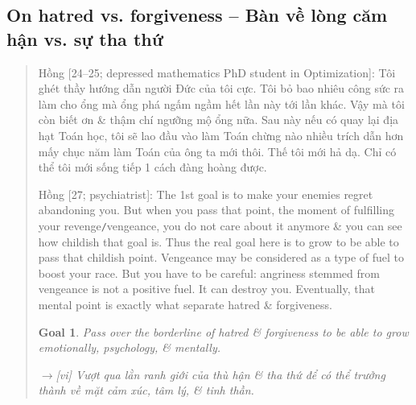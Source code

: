 \documentclass[12pt,oneside]{book}
\newtheorem{goal}{Goal}
\begin{document}
\subsection{On hatred vs. forgiveness -- Bàn về lòng căm hận vs. sự tha thứ}

\begin{quote}
	{\sf Hồng [24--25; depressed mathematics PhD student in Optimization]}: Tôi ghét thầy hướng dẫn người Đức của tôi cực. Tôi bỏ bao nhiêu công sức ra làm cho ổng mà ổng phá ngấm ngầm hết lần này tới lần khác. Vậy mà tôi còn biết ơn \& thậm chí ngưỡng mộ ổng nữa. Sau này nếu có quay lại địa hạt Toán học, tôi sẽ lao đầu vào làm Toán chừng nào nhiều trích dẫn hơn mấy chục năm làm Toán của ông ta mới thôi. Thế tôi mới hả dạ. Chỉ có thể tôi mới sống tiếp 1 cách đàng hoàng được.
	
	{\sf Hồng [27; psychiatrist]}: The 1st goal is to make your enemies regret abandoning you. But when you pass that point, the moment of fulfilling your revenge{\tt/}vengeance, you do not care about it anymore \& you can see how childish that goal is. Thus the real goal here is to grow to be able to pass that childish point. Vengeance may be considered as a type of fuel to boost your race. But you have to be careful: angriness stemmed from vengeance is not a positive fuel. It can destroy you. Eventually, that mental point is exactly what separate hatred \& forgiveness.
	
	\begin{goal}
		Pass over the borderline of hatred \& forgiveness to be able to grow emotionally, psychology, \& mentally.
		
		{\sf[en]$\to$[vi]} Vượt qua lằn ranh giới của thù hận \& tha thứ để có thể trưởng thành về mặt cảm xúc, tâm lý, \& tinh thần.
	\end{goal}
	

\end{quote}
\end{document}
